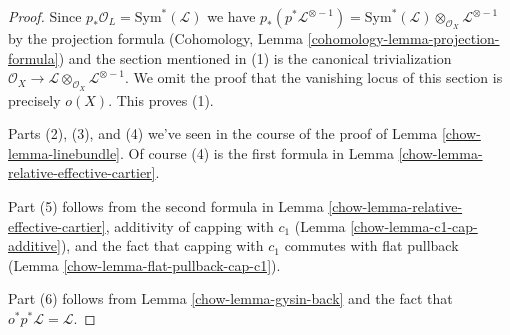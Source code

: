 \begin{proof}

Since $p_*\mathcal{O}_L = \text{Sym}^*(\mathcal{L})$ we have
$p_*(p^*\mathcal{L}^{\otimes -1}) =
\text{Sym}^*(\mathcal{L}) \otimes_{\mathcal{O}_X} \mathcal{L}^{\otimes -1}$
by the projection formula
(Cohomology, Lemma \ref{cohomology-lemma-projection-formula})
and the section mentioned in (1) is
the canonical trivialization $\mathcal{O}_X \to
\mathcal{L} \otimes_{\mathcal{O}_X} \mathcal{L}^{\otimes -1}$.
We omit the proof that the vanishing locus of
this section is precisely $o(X)$. This proves (1).

\medskip\noindent
Parts (2), (3), and (4) we've seen in the course of the proof of
Lemma \ref{chow-lemma-linebundle}. Of course (4) is the first
formula in Lemma \ref{chow-lemma-relative-effective-cartier}.

\medskip\noindent
Part (5) follows from the second formula in
Lemma \ref{chow-lemma-relative-effective-cartier},
additivity of capping with $c_1$ (Lemma \ref{chow-lemma-c1-cap-additive}),
and the fact that capping with $c_1$ commutes with flat pullback
(Lemma \ref{chow-lemma-flat-pullback-cap-c1}).

\medskip\noindent
Part (6) follows from Lemma \ref{chow-lemma-gysin-back}
and the fact that $o^*p^*\mathcal{L} = \mathcal{L}$.
\end{proof}

